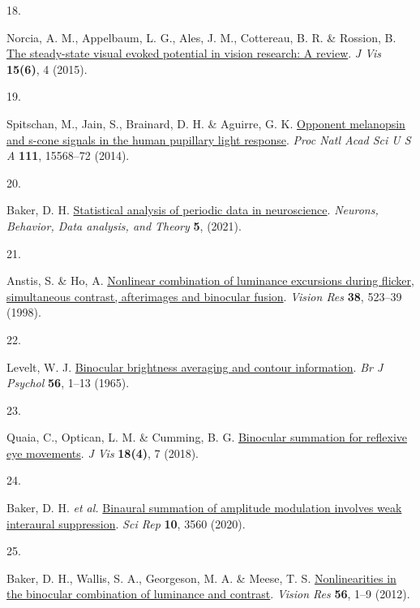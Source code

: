 \documentclass[
]{article}
\newlength{\cslhangindent}
\newlength{\csllabelwidth}
\newlength{\cslentryspacingunit} %
\newenvironment{CSLReferences}[2] %
 {%
  \setlength{\parindent}{0pt}
  \ifodd #1
  \let\oldpar\par
  \def\par{\hangindent=\cslhangindent\oldpar}
  \fi
  \setlength{\parskip}{#2\cslentryspacingunit}
 }%
 {}
\newcommand{\CSLLeftMargin}[1]{\parbox[t]{\csllabelwidth}{#1}}
\newcommand{\CSLRightInline}[1]{\parbox[t]{\linewidth - \csllabelwidth}{#1}\break}
\begin{document}
\begin{CSLReferences}{0}{0}
\leavevmode{}%
\CSLLeftMargin{18. }%
\CSLRightInline{Norcia, A. M., Appelbaum, L. G., Ales, J. M., Cottereau, B. R. \& Rossion, B. \href{https://doi.org/10.1167/15.6.4}{The steady-state visual evoked potential in vision research: A review}. \emph{J Vis} \textbf{15(6)}, 4 (2015).}

\leavevmode{}%
\CSLLeftMargin{19. }%
\CSLRightInline{Spitschan, M., Jain, S., Brainard, D. H. \& Aguirre, G. K. \href{https://doi.org/10.1073/pnas.1400942111}{Opponent melanopsin and s-cone signals in the human pupillary light response}. \emph{Proc Natl Acad Sci U S A} \textbf{111}, 15568--72 (2014).}

\leavevmode{}%
\CSLLeftMargin{20. }%
\CSLRightInline{Baker, D. H. \href{https://doi.org/10.51628/001c.27680}{Statistical analysis of periodic data in neuroscience}. \emph{Neurons, Behavior, Data analysis, and Theory} \textbf{5}, (2021).}

\leavevmode{}%
\CSLLeftMargin{21. }%
\CSLRightInline{Anstis, S. \& Ho, A. \href{https://doi.org/10.1016/s0042-6989(97)00167-3}{Nonlinear combination of luminance excursions during flicker, simultaneous contrast, afterimages and binocular fusion}. \emph{Vision Res} \textbf{38}, 523--39 (1998).}

\leavevmode{}%
\CSLLeftMargin{22. }%
\CSLRightInline{Levelt, W. J. \href{https://doi.org/10.1111/j.2044-8295.1965.tb00939.x}{Binocular brightness averaging and contour information}. \emph{Br J Psychol} \textbf{56}, 1--13 (1965).}

\leavevmode{}%
\CSLLeftMargin{23. }%
\CSLRightInline{Quaia, C., Optican, L. M. \& Cumming, B. G. \href{https://doi.org/10.1167/18.4.7}{Binocular summation for reflexive eye movements}. \emph{J Vis} \textbf{18(4)}, 7 (2018).}

\leavevmode{}%
\CSLLeftMargin{24. }%
\CSLRightInline{Baker, D. H. \emph{et al.} \href{https://doi.org/10.1038/s41598-020-60602-5}{Binaural summation of amplitude modulation involves weak interaural suppression}. \emph{Sci Rep} \textbf{10}, 3560 (2020).}

\leavevmode{}%
\CSLLeftMargin{25. }%
\CSLRightInline{Baker, D. H., Wallis, S. A., Georgeson, M. A. \& Meese, T. S. \href{https://doi.org/10.1016/j.visres.2012.01.008}{Nonlinearities in the binocular combination of luminance and contrast}. \emph{Vision Res} \textbf{56}, 1--9 (2012).}


\end{CSLReferences}
\end{document}
